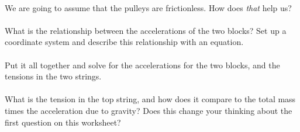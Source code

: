 \documentclass[12pt]{article}
\newcounter{problem}
\begin{document}
\paragraph{\theproblem}%
We are going to assume that the pulleys are frictionless. How does
\emph{that} help us?

\paragraph{\theproblem}%
What is the relationship between the accelerations of the two blocks?
Set up a coordinate system and describe this relationship with an
equation.

\paragraph{\theproblem}%
Put it all together and solve for the accelerations for the two
blocks, and the tensions in the two strings.

\paragraph{\theproblem}%
What is the tension in the top string, and how does it compare to the
total mass times the acceleration due to gravity? Does this change
your thinking about the first question on this worksheet?
\end{document}
